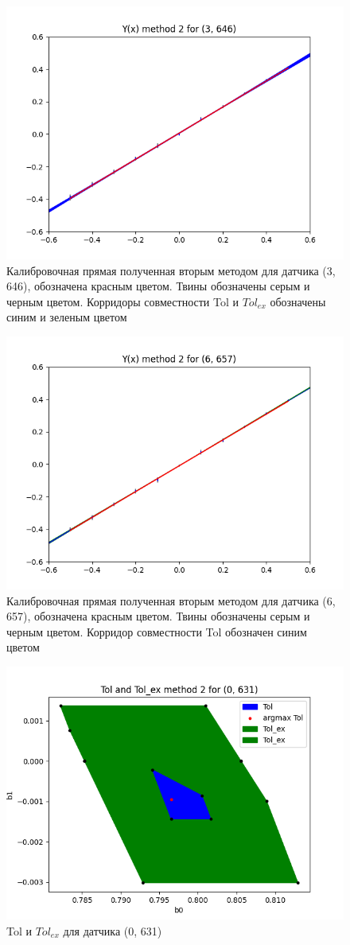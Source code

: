 \begin{figure}[H]
    \centering
    \includegraphics[width=0.7\linewidth]{image/3_646_method_2_corridor_joint_dependence.png}
    \caption{Калибровочная прямая полученная вторым методом для датчика (3, 646), обозначена красным цветом. Твины обозначены серым и черным цветом. Корридоры совместности Tol и $Tol_{ex}$ обозначены синим и зеленым цветом}
    \label{fig:3_646_method_2}
\end{figure}

\begin{figure}[H]
    \centering
    \includegraphics[width=0.7\linewidth]{image/6_657_method_2_corridor_joint_dependence.png}
    \caption{Калибровочная прямая полученная вторым методом для датчика (6, 657), обозначена красным цветом. Твины обозначены серым и черным цветом. Корридор совместности Tol обозначен синим цветом}
    \label{fig:6_657_method_2}
\end{figure}

\begin{figure}[H]
    \centering
    \includegraphics[width=0.7\linewidth]{image/0_631_method_2.png}
    \caption{Tol и $Tol_{ex}$ для датчика (0, 631)}
    \label{fig:0_631_tol}
\end{figure}

